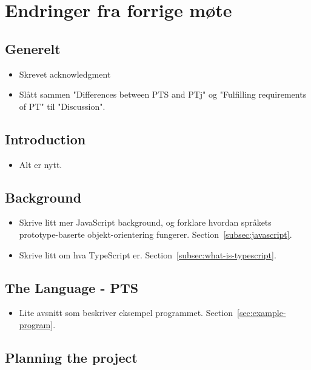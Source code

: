 
\chapter*{Endringer fra forrige møte}

\section*{Generelt}

\begin{itemize}
    \item Skrevet acknowledgment
    \item Slått sammen "Differences between PTS and PTj" og "Fulfilling requirements of PT" til "Discussion".
\end{itemize}

\section*{Introduction}

\begin{itemize}
    \item Alt er nytt.
\end{itemize}

\section*{Background}

\begin{itemize}
    \item Skrive litt mer JavaScript background, og forklare hvordan språkets prototype-baserte objekt-orientering fungerer.
    Section~\vref{subsec:javascript}.
    \item Skrive litt om hva TypeScript er.
    Section~\vref{subsec:what-is-typescript}.
\end{itemize}

\section*{The Language - PTS}

\begin{itemize}
    \item Lite avsnitt som beskriver eksempel programmet.
    Section~\vref{sec:example-program}.
\end{itemize}

\section*{Planning the project}

